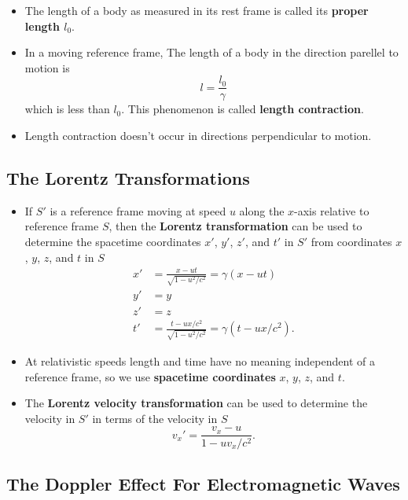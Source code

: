 \documentclass{article}
\begin{document}
\begin{itemize}
  \item The length of a body as measured in its rest frame is called its \textbf{proper length $l_0$}.

  \item In a moving reference frame, The length of a body in the direction parellel to motion is \[l = \frac{l_0}{\gamma}\] which is less than $l_0$. This phenomenon is called \textbf{length contraction}.

  \item Length contraction doesn't occur in directions perpendicular to motion.
\end{itemize}

\subsection{The Lorentz Transformations}

\begin{itemize}
  \item If $S'$ is a reference frame moving at speed $u$ along the $x$-axis relative to reference frame $S$, then the \textbf{Lorentz transformation} can be used to determine the spacetime coordinates $x'$, $y'$, $z'$, and $t'$ in $S'$ from coordinates $x$, $y$, $z$, and $t$ in $S$ \begin{align*}
          x' & = \frac{x - u t}{\sqrt{1 - u^2 / c^2}} = \gamma (x - u t)              \\
          y' & = y                                                                    \\
          z' & = z                                                                    \\
          t' & = \frac{t - u x / c^2}{\sqrt{1 - u^2 / c^2}} = \gamma (t - u x / c^2).
        \end{align*}

  \item At relativistic speeds length and time have no meaning independent of a reference frame, so we use \textbf{spacetime coordinates} $x$, $y$, $z$, and $t$.

  \item The \textbf{Lorentz velocity transformation} can be used to determine the velocity in $S'$ in terms of the velocity in $S$ \[v_x' = \frac{v_x - u}{1 - u v_x / c^2}.\]
\end{itemize}

\subsection{The Doppler Effect For Electromagnetic Waves}
\end{document}
